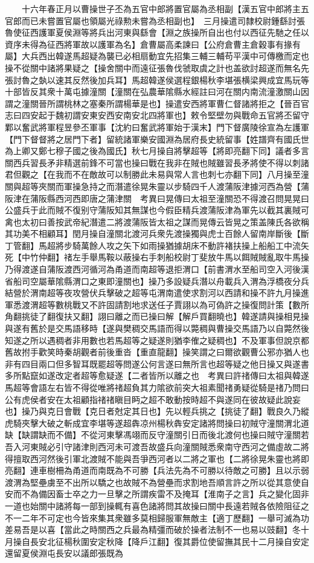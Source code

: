 　　十六年春正月以曹操世子丕為五官中郎將置官屬為丞相副【漢五官中郎將主五官郎而已未嘗置官屬也領屬光祿勲未嘗為丞相副也】　三月操遣司隸校尉鍾繇討張魯使征西護軍夏侯淵等將兵出河東與繇會【淵之族操所自出也付以西征先馳之任以資序未得為征西將軍故以護軍為名】倉曹屬高柔諫曰【公府倉曹主倉穀事有掾有屬】大兵西出韓遂馬超疑為襲已必相扇動宜先招集三輔三輔苟平漢中可傳檄而定也操不從關中諸將果疑之【操舍關中而遠征張魯伐虢取虞之計也盖欲討超遂而無名先張討魯之埶以速其反然後加兵耳】馬超韓遂侯選程銀楊秋李堪張横梁興成宜馬玩等十部皆反其衆十萬屯據潼關【潼關在弘農華隂縣水經註曰河在關内南流潼激關山因謂之潼關晉所謂桃林之塞秦所謂楊華是也】操遣安西將軍曹仁督諸將拒之【晉百官志曰四安起于魏初謂安東安西安南安北四將軍也】敕令堅壁勿與戰命五官將丕留守鄴以奮武將軍程昱參丕軍事【沈約曰奮武將軍始于漢末】門下督廣陵徐宣為左護軍【門下督督將之居門下者】留統諸軍樂安國淵為居府長史統留事【姓譜齊有國氏世為上卿又鄭七穆子國之後為國氏】秋七月操自將擊超等【將即亮翻下同】議者多言關西兵習長矛非精選前鋒不可當也操曰戰在我非在賊也賊雖習長矛將使不得以刺諸君但觀之【在我而不在敵故可以制勝此未易與常人言也刺七亦翻下同】八月操至潼關與超等夾關而軍操急持之而潛遣徐晃朱靈以步騎四千人渡蒲阪津據河西為營【蒲阪津在蒲阪縣西河西即唐之蒲津關　考異曰晃傳曰太祖至潼關恐不得渡召問晃晃曰公盛兵于此而賊不復别守蒲阪知其無謀也今假臣精兵渡蒲阪津為軍先以截其裏賊可禽也太初曰善按武帝紀潛遣二將渡蒲阪皆太祖之謀而晃傳云皆晃之策盖陳氏各欲稱其功美不相顧耳】閏月操自潼關北渡河兵衆先渡操獨與虎士百餘人留南岸斷後【斷丁管翻】馬超將步騎萬餘人攻之矢下如雨操猶據胡床不動許褚扶操上船船工中流矢死【中竹仲翻】禇左手舉馬鞍以蔽操右手刺船校尉丁斐放牛馬以餌賊賊亂取牛馬操乃得渡遂自蒲阪渡西河循河為甬道而南超等退拒渭口【前書渭水至船司空入河後漢省船司空屬華隂縣渭口之東即潼關也】操乃多設疑兵潛以舟載兵入渭為浮橋夜分兵結營於渭南超等夜攻營伏兵擊破之超等屯渭南遣使求割河以西請和操不許九月操進軍悉渡渭超等數桃戰又不許固請割地求送任子賈詡以為可偽許之操復問計策【數所角翻挑徒了翻復扶又翻】詡曰離之而已操曰解【解戶買翻曉也】韓遂請與操相見操與遂有舊於是交馬語移時【遂與樊稠交馬語而得以斃稠與曹操交馬語乃以自斃然後知遂之所以遇稠者非用數也若馬超等之疑遂則猶李傕之疑稠也】不及軍事但說京都舊故拊手歡笑時秦胡觀者前後重沓【重直龍翻】操笑謂之曰爾欲觀曹公邪亦猶人也非有四目兩口但多智耳既罷超等問遂公何言遂曰無所言也超等疑之他日操又與遂書多所點竄如遂改定者超等愈疑遂【二者皆所以離之也　考異曰許禇傳曰太祖與韓遂馬超等會語左右皆不得從唯將禇超負其力隂欲前突大祖素聞禇勇疑從騎是禇乃問曰公有虎侯者安在太祖顧指禇禇瞋目眄之超不敢動按時超不與遂同在彼故疑此說妄也】操乃與克日會戰【克日者尅定其日也】先以輕兵挑之【挑徒了翻】戰良久乃縱虎騎夾擊大破之斬成宜李堪等遂超犇凉州楊秋犇安定諸將問操曰初賊守潼關渭北道缺【缺謂缺而不備】不從河東擊馮翊而反守潼關引日而後北渡何也操曰賊守潼關若吾入河東賊必引守諸津則西河未可渡吾故盛兵向潼關賊悉衆南守西河之備虛故二將得擅取西河然後引軍北渡賊不能與吾爭西河者以二將之軍也【二將徐晃朱靈也將即亮翻】連車樹柵為甬道而南既為不可勝【兵法先為不可勝以待敵之可勝】且以示弱渡渭為堅壘虜至不出所以驕之也故賊不為營壘而求割地吾順言許之所以從其意使自安而不為備因畜士卒之力一旦擊之所謂疾雷不及掩耳【淮南子之言】兵之變化固非一道也始關中諸將每一部到操輒有喜色諸將問其故操曰關中長遠若賊各依險阻征之不一二年不可定也今皆來集其衆雖多莫相歸服軍無敵主【適丁歷翻】一舉可滅為功差易吾是以喜【當此之時關西之兵最為精彊而破於操者法制不一也易以豉翻】冬十月操自長安北征楊秋圍安定秋降【降戶江翻】復其爵位使留撫其民十二月操自安定還留夏侯淵屯長安以議郎張既為